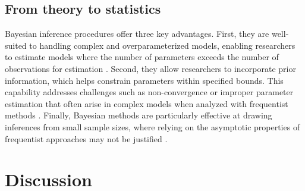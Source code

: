 \documentclass[
  authoryear,
  review,
  1p]{elsarticle}
\begin{document}
\begin{figure}


\caption{\label{fig-CJ_TM_15}}

\end{figure}%

\subsection{From theory to statistics}\label{sec-theory-statistics}

Bayesian inference procedures offer three key advantages. First, they
are well-suited to handling complex and overparameterized models,
enabling researchers to estimate models where the number of parameters
exceeds the number of observations for estimation
\citep{Baker_1998, Kim_et_al_1999}. Second, they allow researchers to
incorporate prior information, which helps constrain parameters within
specified bounds. This capability addresses challenges such as
non-convergence or improper parameter estimation that often arise in
complex models when analyzed with frequentist methods
\citep{Martin_et_al_1975, Seaman_et_al_2011}. Finally, Bayesian methods
are particularly effective at drawing inferences from small sample
sizes, where relying on the asymptotic properties of frequentist
approaches may not be justified
\citep{Baldwin_et_al_2013, Lambert_et_al_2006, Depaoli_2014}.

\section{Discussion}\label{sec-discuss}
\end{document}
